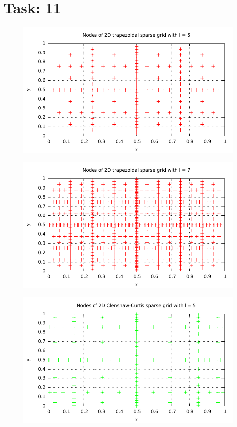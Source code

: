\documentclass{article}
\begin{document}
\section*{Task: 11}

\begin{figure}[htbp]
  \centering
     \includegraphics[width=1.0\textwidth]{../Task11/sh3_task11_point_plot_trapezoidal_l=5.pdf}
\end{figure}

\begin{figure}[htbp]
  \centering
     \includegraphics[width=1.0\textwidth]{../Task11/sh3_task11_point_plot_trapezoidal_l=7.pdf}
\end{figure}
\newpage
\begin{figure}[htbp]
  \centering
     \includegraphics[width=1.0\textwidth]{../Task11/sh3_task11_point_plot_clenshawCurtis_l=5.pdf}
\end{figure}
\end{document}

